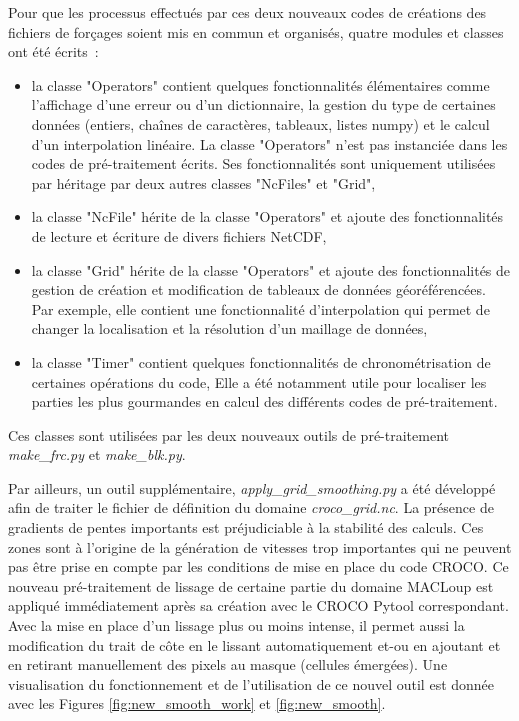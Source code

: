\documentclass[10pt,a4paper,titlepage]{article}
\begin{document}
Pour que les processus effectués par ces deux nouveaux codes de créations des fichiers de forçages soient mis en commun et organisés, quatre modules et classes ont été écrits~:
\begin{itemize}
    \item la classe "Operators" contient quelques fonctionnalités élémentaires comme l'affichage d'une erreur ou d'un dictionnaire, la gestion du type de certaines données (entiers, chaînes de caractères, tableaux, listes numpy) et le calcul d'un interpolation linéaire.
    La classe "Operators" n'est pas instanciée dans les codes de pré-traitement écrits.
    Ses fonctionnalités sont uniquement  utilisées par héritage par deux autres classes "NcFiles" et "Grid",
    \item la classe "NcFile" hérite de la classe "Operators" et ajoute des fonctionnalités de lecture et écriture de divers fichiers NetCDF,
    \item la classe "Grid" hérite de la classe "Operators" et ajoute des fonctionnalités de gestion de création et modification de tableaux de données géoréférencées.
    Par exemple, elle contient une fonctionnalité d'interpolation qui permet de changer la localisation et la résolution d'un maillage de données,
    \item la classe "Timer" contient quelques fonctionnalités de chronométrisation de certaines opérations du code,
    Elle a été notamment utile pour localiser les parties les plus gourmandes en calcul des différents codes de pré-traitement.
\end{itemize}
Ces classes sont utilisées par les deux nouveaux outils de pré-traitement \textit{make\_frc.py} et \textit{make\_blk.py}.

Par ailleurs, un outil supplémentaire, \textit{apply\_grid\_smoothing.py} a été développé afin de traiter le fichier de définition du domaine \textit{croco\_grid.nc}.
La présence de gradients de pentes importants est préjudiciable à la stabilité des calculs. Ces zones sont à l'origine de la génération de vitesses trop importantes qui ne peuvent pas être prise en compte par les conditions de mise en place du code CROCO.
Ce nouveau pré-traitement de lissage de certaine partie du domaine MACLoup est appliqué immédiatement après sa création avec le CROCO Pytool correspondant.
Avec la mise en place d'un lissage plus ou moins intense, il permet aussi la modification du trait de côte en le lissant automatiquement et-ou en ajoutant et en retirant manuellement des pixels au masque (cellules émergées).
Une visualisation du fonctionnement et de l'utilisation de ce nouvel outil est donnée avec les Figures \ref{fig:new_smooth_work} et \ref{fig:new_smooth}.
\end{document}
